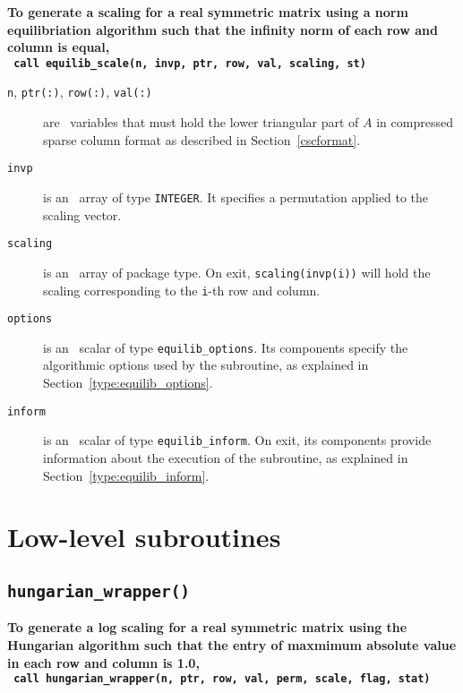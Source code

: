 \textbf{\noindent
   To generate a scaling for a real symmetric matrix using a norm equilibriation algorithm such that the infinity norm of each row and column is equal,
   \vspace*{0.1cm} \\
   \texttt{ \hspace*{0.2cm}
      call equilib\_scale(n, invp, ptr, row, val, scaling, st)
   }
   \vspace{0.3cm}
}

\begin{description}

\item[\texttt{n}, \texttt{ptr(:)}, \texttt{row(:)}, \texttt{val(:)}] are \intentin\ variables that must hold the lower triangular part of $A$ in compressed sparse column format as described in Section~\ref{cscformat}.

\item[\texttt{invp}] is an \intentin\ array of type {\tt INTEGER}. It specifies
a permutation applied to the scaling vector.

\item[\texttt{scaling}] is an \intentout\ array of package type. On exit,
\texttt{scaling(invp(i))} will hold the scaling corresponding to the
\texttt{i}-th row and column.

\item[\texttt{options}] is an \intentin\ scalar of type \texttt{equilib\_options}. Its components specify the algorithmic options used by the subroutine, as explained in Section~\ref{type:equilib_options}.

\item[\texttt{inform}] is an \intentout\ scalar of type \texttt{equilib\_inform}. On exit, its components provide information about the execution of the subroutine, as explained in Section~\ref{type:equilib_inform}.

\end{description}

\section{Low-level subroutines}

\subsection{\texttt{hungarian\_wrapper()}}


\textbf{\noindent
   To generate a log scaling for a real symmetric matrix using the Hungarian algorithm such that the entry of maxmimum absolute value in each row and column is 1.0,
   \vspace*{0.1cm} \\
   \texttt{ \hspace*{0.2cm}
      call hungarian\_wrapper(n, ptr, row, val, perm, scale, flag, stat)
   }
   \vspace{0.3cm}
}

